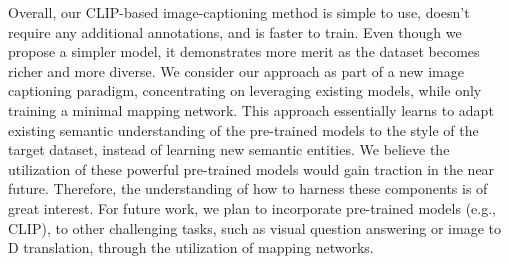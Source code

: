 Overall, our CLIP-based image-captioning method is simple to use, doesn't require any additional annotations, and is faster to train. Even though we propose a simpler model, it demonstrates more merit as the dataset becomes richer and more diverse. We consider our approach as part of a new image captioning paradigm, concentrating on leveraging existing models, while only training a minimal mapping network. This approach essentially learns to adapt existing semantic understanding of the pre-trained models to the style of the target dataset, instead of learning new semantic entities. We believe the utilization of these powerful pre-trained models would gain traction in the near future. Therefore, the understanding of how to harness these components is of great interest. For future work, we plan to incorporate pre-trained models (e.g., CLIP), to other challenging tasks, such as visual question answering or image to D translation, through the utilization of mapping networks. 

